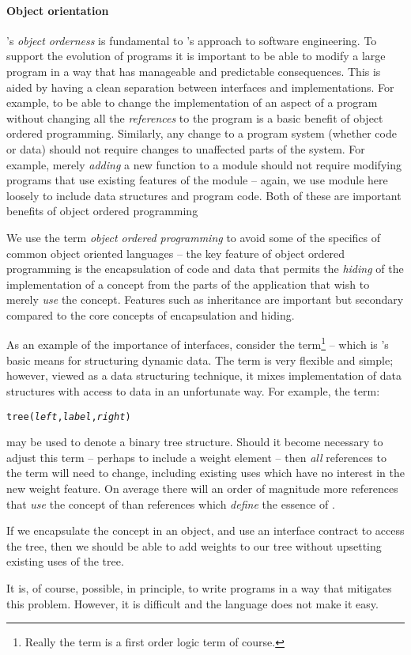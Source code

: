 \paragraph{Object orientation}
\go's \emph{object orderness} is fundamental to \go's approach to  software engineering.  To support the evolution of programs it is important to be able to modify a large program in a way that has manageable and predictable consequences. This is aided by having a clean separation between interfaces and implementations. For example, to be able to change the implementation of an aspect of a program without changing all the \emph{references} to the program is a basic benefit of object ordered programming. Similarly, any change to a program system (whether code or data) should not require changes to unaffected parts of the system. For example, merely \emph{adding} a new function to a module should not require modifying programs that use existing features of the module -- again, we use module here loosely to include data structures and program code. Both of these are important benefits of object ordered programming

\begin{aside}
We use the term \emph{object ordered programming} to avoid some of the specifics of common object oriented languages -- the key feature of object ordered programming is the encapsulation of code and data that permits the \emph{hiding} of the implementation of a concept from the parts of the application that wish to merely \emph{use} the concept. Features such as inheritance are important but secondary compared to the core concepts of encapsulation and hiding.

As an example of the importance of interfaces, consider the \prolog term\footnote{Really the \prolog term is a first order logic term of course.} -- which is \prolog's basic means for structuring dynamic data. The term is very flexible and simple; however, viewed as a data structuring technique, it mixes implementation of data structures with access to data in an unfortunate way. For example, the  term:
\begin{alltt}
tree(\emph{left},\emph{label},\emph{right})
\end{alltt}
may be used to denote a binary tree structure. Should it become necessary to adjust this term -- perhaps to include a weight element -- then \emph{all} references to the  term will need to change, including existing uses which have no interest in the new weight feature. On average there will an order of magnitude more references that \emph{use} the concept of  than references which \emph{define} the essence of .

If we encapsulate the  concept in an object, and use an interface contract to access the tree, then we should be able to add weights to our tree without upsetting existing uses of the tree.

It is, of course, possible, in principle, to write \prolog programs in a way that mitigates this problem. However, it is difficult and the \prolog language does not make it easy.
\end{aside}

